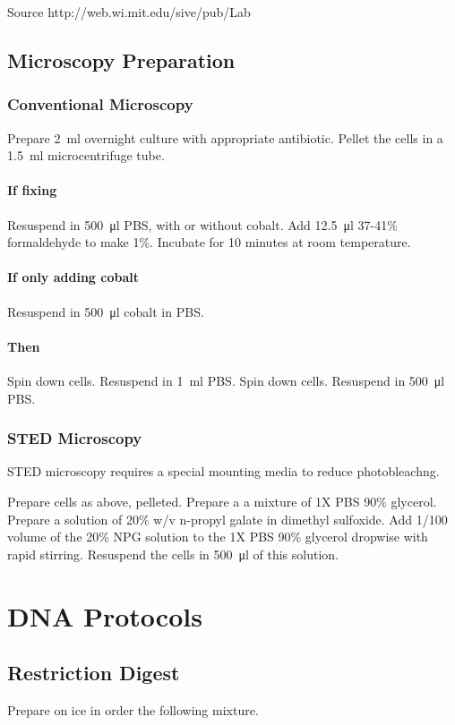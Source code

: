 \documentclass[../main.tex]{subfiles}
\begin{document}
Source http://web.wi.mit.edu/sive/pub/Lab%

\subsection{Microscopy Preparation}

\subsubsection{Conventional Microscopy}
Prepare \SI{2}{\milli\litre} overnight culture with appropriate antibiotic.
Pellet the cells in a \SI{1.5}{\milli\litre} microcentrifuge tube.
\paragraph{If fixing}
Resuspend in \SI{500}{\micro\litre} PBS, with or without cobalt.
Add \SI{12.5}{\micro\litre} 37-41\% formaldehyde to make 1\%.
Incubate for 10 minutes at room temperature.
\paragraph{If only adding cobalt}
Resuspend in \SI{500}{\micro\litre} cobalt in PBS.
\paragraph{Then}
Spin down cells.
Resuspend in \SI{1}{\milli\litre} PBS.
Spin down cells.
Resuspend in \SI{500}{\micro\litre} PBS.

\subsubsection{STED Microscopy}
STED microscopy requires a special mounting media to reduce photobleachng.

Prepare cells as above, pelleted. Prepare a a mixture of 1X PBS 90\% glycerol. Prepare a solution of 20\% w/v n-propyl galate in dimethyl sulfoxide. Add 1/100 volume of the 20\% NPG solution to the 1X PBS 90\% glycerol dropwise with rapid stirring. Resuspend the cells in \SI{500}{\micro\litre} of this solution.


\section{DNA Protocols}
\subsection{Restriction Digest}
Prepare on ice in order the following mixture.
\end{document}
